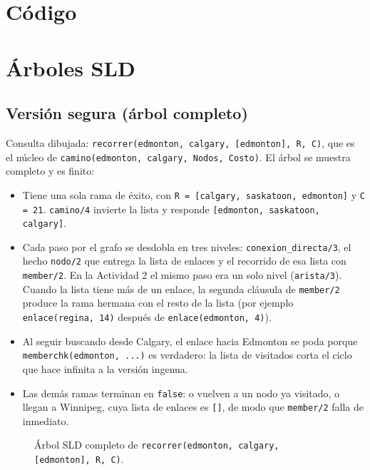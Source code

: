 \documentclass[12pt]{report}
\begin{document}
\section{Código}



\section{Árboles SLD}

\subsection{Versión segura (árbol completo)}

\begin{sloppypar}
Consulta dibujada: \texttt{recorrer(edmonton, calgary, [edmonton], R, C)},
que es el núcleo de \texttt{camino(edmonton, calgary, Nodos, Costo)}. El
árbol se muestra completo y es finito:
\end{sloppypar}

\begin{itemize}
    \item Tiene una sola rama de éxito, con
          \texttt{R = [calgary, saskatoon, edmonton]} y
          \texttt{C = 21}. \texttt{camino/4} invierte la lista y
          responde \texttt{[edmonton, saskatoon, calgary]}.
    \item Cada paso por el grafo se desdobla en tres niveles:
          \texttt{conexion\_directa/3}, el hecho \texttt{nodo/2} que
          entrega la lista de enlaces y el recorrido de esa lista con
          \texttt{member/2}. En la Actividad 2 el mismo paso era un solo
          nivel (\texttt{arista/3}). Cuando la lista tiene más de un
          enlace, la segunda cláusula de \texttt{member/2} produce la rama
          hermana con el resto de la lista (por ejemplo
          \texttt{enlace(regina, 14)} después de
          \texttt{enlace(edmonton, 4)}).
    \item Al seguir buscando desde Calgary, el enlace hacia Edmonton se
          poda porque \texttt{memberchk(edmonton, ...)} es verdadero: la
          lista de visitados corta el ciclo que hace infinita a la versión
          ingenua.
    \item Las demás ramas terminan en \texttt{false}: o vuelven a un nodo
          ya visitado, o llegan a Winnipeg, cuya lista de enlaces es
          \texttt{[]}, de modo que \texttt{member/2} falla de inmediato.
\end{itemize}
\begin{figure}[p]
    \centering
    \caption{Árbol SLD completo de \texttt{recorrer(edmonton, calgary, [edmonton], R, C)}.}
\end{figure}
\end{document}
